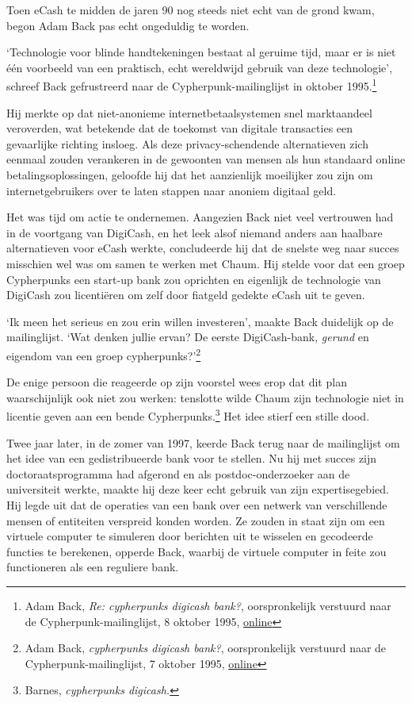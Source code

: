 \documentclass[
  a5paper,
  smalldemyvopaper,11pt,twoside,onecolumn,openright,extrafontsizes,
hidelinks]{memoir}
\begin{document}
Toen eCash te midden de jaren 90 nog steeds niet echt van de grond kwam,
begon Adam Back pas echt ongeduldig te worden.

`Technologie voor blinde handtekeningen bestaat al geruime tijd, maar er
is niet één voorbeeld van een praktisch, echt wereldwijd gebruik van
deze technologie', schreef Back gefrustreerd naar de
Cypherpunk-mailinglijst in oktober 1995.\footnote{Adam Back, \emph{Re:
  cypherpunks digicash bank?}, oorspronkelijk verstuurd naar de
  Cypherpunk-mailinglijst, 8 oktober 1995,
  \href{https://cypherpunks.venona.com/date/1995/10/msg00734.html}{online}}

Hij merkte op dat niet-anonieme internetbetaalsystemen snel marktaandeel
veroverden, wat betekende dat de toekomst van digitale transacties een
gevaarlijke richting insloeg. Als deze privacy-schendende alternatieven
zich eenmaal zouden verankeren in de gewoonten van mensen als hun
standaard online betalingsoplossingen, geloofde hij dat het aanzienlijk
moeilijker zou zijn om internetgebruikers over te laten stappen naar
anoniem digitaal geld.

Het was tijd om actie te ondernemen. Aangezien Back niet veel vertrouwen
had in de voortgang van DigiCash, en het leek alsof niemand anders aan
haalbare alternatieven voor eCash werkte, concludeerde hij dat de
snelste weg naar succes misschien wel was om samen te werken met Chaum.
Hij stelde voor dat een groep Cypherpunks een start-up bank zou
oprichten en eigenlijk de technologie van DigiCash zou licentiëren om
zelf door fiatgeld gedekte eCash uit te geven.

`Ik meen het serieus en zou erin willen investeren', maakte Back
duidelijk op de mailinglijst. `Wat denken jullie ervan? De eerste
DigiCash-bank, \emph{gerund} en eigendom van een groep
cypherpunks?'\footnote{Adam Back, \emph{cypherpunks digicash bank?},
  oorspronkelijk verstuurd naar de Cypherpunk-mailinglijst, 7 oktober
  1995,
  \href{https://cypherpunks.venona.com/date/1995/10/msg00690.html}{online}}

De enige persoon die reageerde op zijn voorstel wees erop dat dit plan
waarschijnlijk ook niet zou werken: tenslotte wilde Chaum zijn
technologie niet in licentie geven aan een bende Cypherpunks.\footnote{Barnes,
  \emph{cypherpunks digicash.}} Het idee stierf een stille dood.

Twee jaar later, in de zomer van 1997, keerde Back terug naar de
mailinglijst om het idee van een gedistribueerde bank voor te stellen.
Nu hij met succes zijn doctoraatsprogramma had afgerond en als
postdoc-onderzoeker aan de universiteit werkte, maakte hij deze keer
echt gebruik van zijn expertisegebied. Hij legde uit dat de operaties
van een bank over een netwerk van verschillende mensen of entiteiten
verspreid konden worden. Ze zouden in staat zijn om een virtuele
computer te simuleren door berichten uit te wisselen en gecodeerde
functies te berekenen, opperde Back, waarbij de virtuele computer in
feite zou functioneren als een reguliere bank.
\end{document}

